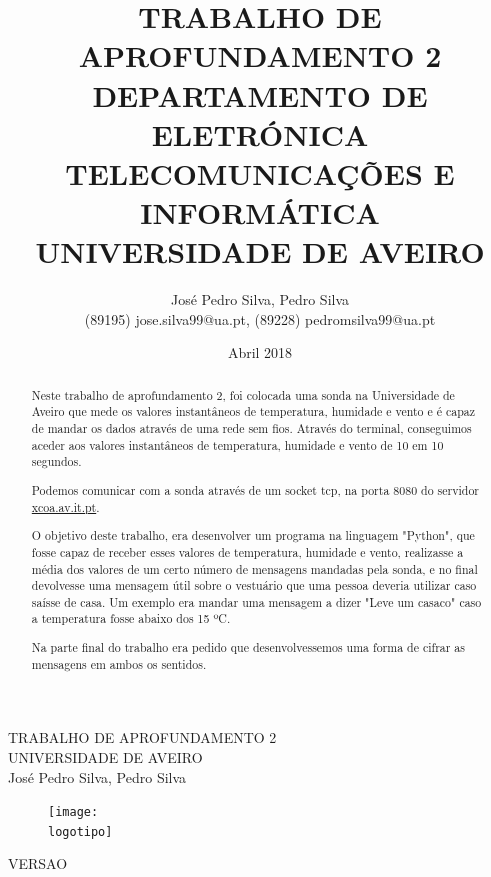 \documentclass{report}
\begin{document}
%
\def\titulo{TRABALHO DE APROFUNDAMENTO 2}
\def\data{Abril 2018}
\def\autores{José Pedro Silva, Pedro Silva}
\def\autorescontactos{(89195) jose.silva99@ua.pt, (89228) pedromsilva99@ua.pt}
\def\versao{VERSAO}
\def\departamento{DEPARTAMENTO DE ELETRÓNICA TELECOMUNICAÇÕES E INFORMÁTICA}
\def\empresa{UNIVERSIDADE DE AVEIRO}
\def\logotipo{ua.pdf}
%
%
\begin{titlepage}

\begin{center}
%
\vspace*{50mm}
%
{\Huge \titulo}\\ 
%
\vspace{10mm}
%
{\Large \empresa}\\
%
\vspace{10mm}
%
{\LARGE \autores}\\ 
%
\vspace{30mm}
%
\begin{figure}[h]
\center
\texttt{[image: \\logotipo]}
\end{figure}
%
\vspace{30mm}
\end{center}
%
\begin{flushright}
\versao
\end{flushright}
\end{titlepage}

\title{%
{\Huge\textbf{\titulo}}\\
{\Large \departamento\\ \empresa}
}
%
\author{%
    \autores \\
    \autorescontactos
}
%
\date{\data}
%
\maketitle


\begin{abstract}
Neste trabalho de aprofundamento 2, foi colocada uma sonda na Universidade de Aveiro que mede os valores instantâneos de temperatura, humidade e vento e é capaz de mandar os dados através de uma rede sem fios. Através do terminal, conseguimos aceder aos valores instantâneos de temperatura, humidade e vento de 10 em 10 segundos.

Podemos comunicar com a sonda através de um socket \ac{tcp},  na porta 8080 do servidor \url{xcoa.av.it.pt}.


O objetivo deste trabalho, era desenvolver um programa na linguagem "Python", que fosse capaz de receber esses valores de temperatura, humidade e vento, realizasse a média dos valores de um certo número de mensagens mandadas pela sonda, e no final devolvesse uma mensagem útil sobre o vestuário que uma pessoa deveria utilizar caso saísse de casa. Um exemplo era mandar uma mensagem a dizer "Leve um casaco" caso a temperatura fosse abaixo dos 15 ºC. 

Na parte final do trabalho era pedido que desenvolvessemos uma forma de cifrar as mensagens em ambos os sentidos.


\end{abstract}
\end{document}

